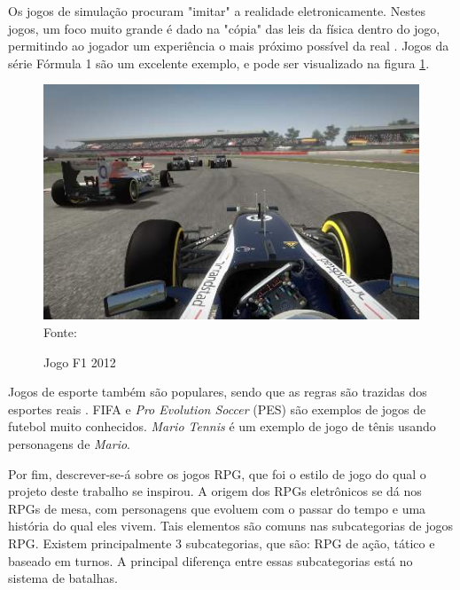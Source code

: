 \documentclass[
	12pt,					%
	openright,				%
	oneside,				%
	a4paper,				%
	bibjustif,				%
	chapter=TITLE,			%
	english,				%
	brazil,					%
	]{abntex2}
\newcommand{\source}[1]{\small Fonte: {#1}}
\begin{document}
		Os jogos de simulação procuram "imitar"{} a realidade eletronicamente.
		Nestes jogos, um foco muito grande é dado na "cópia"{} das leis da física dentro do jogo,
		permitindo ao jogador um experiência o mais próximo possível da real \cite{gameGenres}.
		Jogos da série Fórmula 1 são um excelente exemplo,
		e pode ser visualizado na figura \ref{fig:formula1}.
		
		\begin{figure}[ht!]
			\caption{Jogo F1 2012}
			\centering
			\includegraphics[scale=0.75]{img/formula1.jpg}\\
			\vspace{0.5mm}
			\source{}
			\label{fig:formula1}
		\end{figure}
		
		Jogos de esporte também são populares,
		sendo que as regras são trazidas dos esportes reais \cite{gameGenres}.
		FIFA e \textit{Pro Evolution Soccer} (PES) são exemplos de jogos de futebol muito conhecidos.
		\textit{Mario Tennis} é um exemplo de jogo de tênis usando personagens de \textit{Mario}.
		
		Por fim, descrever-se-á sobre os jogos RPG,
		que foi o estilo de jogo do qual o projeto deste trabalho se inspirou.
		A origem dos RPGs eletrônicos se dá nos RPGs de mesa,
		com personagens que evoluem com o passar do tempo
		e uma história do qual eles vivem.
		Tais elementos são comuns nas subcategorias de jogos RPG.
		Existem principalmente 3 subcategorias,
		que são: RPG de ação, tático e baseado em turnos.
		A principal diferença entre essas subcategorias está no sistema de batalhas.
		
\end{document}
